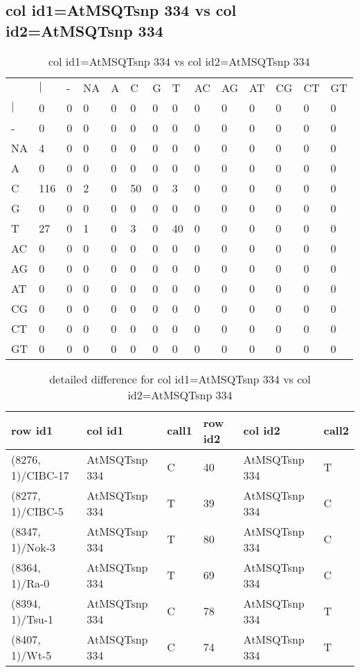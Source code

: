 \subsection{col id1=AtMSQTsnp 334 vs col id2=AtMSQTsnp 334}
\begin{center}
\begin{longtable}{|l|l|l|l|l|l|l|l|l|l|l|l|l|l|}
\caption{col id1=AtMSQTsnp 334 vs col id2=AtMSQTsnp 334} \label{table_dm674}\\
\hline
\\
\hline
&$|$&-&NA&A&C&G&T&AC&AG&AT&CG&CT&GT\\
$|$&0&0&0&0&0&0&0&0&0&0&0&0&0\\
-&0&0&0&0&0&0&0&0&0&0&0&0&0\\
NA&4&0&0&0&0&0&0&0&0&0&0&0&0\\
A&0&0&0&0&0&0&0&0&0&0&0&0&0\\
C&116&0&2&0&50&0&3&0&0&0&0&0&0\\
G&0&0&0&0&0&0&0&0&0&0&0&0&0\\
T&27&0&1&0&3&0&40&0&0&0&0&0&0\\
AC&0&0&0&0&0&0&0&0&0&0&0&0&0\\
AG&0&0&0&0&0&0&0&0&0&0&0&0&0\\
AT&0&0&0&0&0&0&0&0&0&0&0&0&0\\
CG&0&0&0&0&0&0&0&0&0&0&0&0&0\\
CT&0&0&0&0&0&0&0&0&0&0&0&0&0\\
GT&0&0&0&0&0&0&0&0&0&0&0&0&0\\
\hline
\end{longtable}
\end{center}

\begin{center}
\begin{longtable}{|l|l|l|l|l|l|}
\caption{detailed difference for col id1=AtMSQTsnp 334 vs col id2=AtMSQTsnp 334} \label{table_dm675}\\
\hline
row id1&col id1&call1&row id2&col id2&call2\\
\hline
(8276, 1)/CIBC-17&AtMSQTsnp 334&C&40&AtMSQTsnp 334&T\\
(8277, 1)/CIBC-5&AtMSQTsnp 334&T&39&AtMSQTsnp 334&C\\
(8347, 1)/Nok-3&AtMSQTsnp 334&T&80&AtMSQTsnp 334&C\\
(8364, 1)/Ra-0&AtMSQTsnp 334&T&69&AtMSQTsnp 334&C\\
(8394, 1)/Tsu-1&AtMSQTsnp 334&C&78&AtMSQTsnp 334&T\\
(8407, 1)/Wt-5&AtMSQTsnp 334&C&74&AtMSQTsnp 334&T\\
\hline
\end{longtable}
\end{center}

